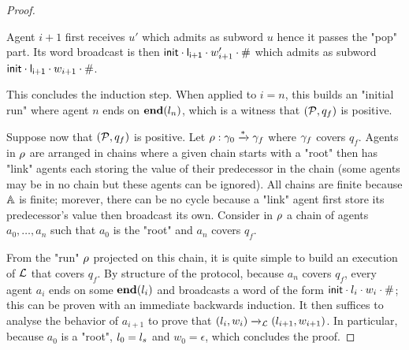 \begin{proof}
\begin{itemize}
		Agent $i+1$ first receives $u'$ which admits as subword $u$ hence it passes the "pop" part. Its word broadcast is then $\mathsf{init} \cdot \mathsf{l_{i+1}} \cdot w_{i+1}'  \cdot \mathsf{\#}$ which admits as subword $\mathsf{init} \cdot \mathsf{l_{i+1}} \cdot w_{i+1} \cdot \mathsf{\#}$.
	\end{itemize}
	This concludes the induction step.
	When applied to $i=n$, this builds an "initial run" where agent $n$ ends on $\mathbf{end}(l_n)$, which is a witness that $(\mathcal{P}, q_f)$ is positive.
	
	Suppose now that $(\mathcal{P}, q_f)$ is positive. Let $\rho: \gamma_0 \xrightarrow{*} \gamma_f$ where $\gamma_f$ covers $q_f$. Agents in $\rho$ are arranged in chains where a given chain starts with a "root" then has "link" agents each storing the value of their predecessor in the chain (some agents may be in no chain but these agents can be ignored). All chains are finite because $\mathbb{A}$ is finite; morever, there can be no cycle because a "link" agent first store its predecessor's value then broadcast its own. Consider in $\rho$ a chain of agents $a_0, \dots, a_n$ such that $a_0$ is the "root" and $a_n$ covers $q_f$. 
	
	From the "run" $\rho$ projected on this chain, it is quite simple to build an execution of $\mathcal{L}$ that covers $q_f$. By structure of the protocol, because $a_n$ covers $q_f$, every agent $a_i$ ends on some $\mathbf{end}(l_i)$ and broadcasts a word of the form $\mathsf{init} \cdot l_i \cdot w_i \cdot \mathsf{\#}$; this can be proven with an immediate backwards induction. It then suffices to analyse the behavior of $a_{i+1}$ to prove that $(l_i, w_i) \xrightarrow{}_{\mathcal{L}} (l_{i+1}, w_{i+1})$. In particular, because $a_0$ is a "root", $l_0 = l_s$ and $w_0 = \epsilon$, which concludes the proof. 


\end{proof}
